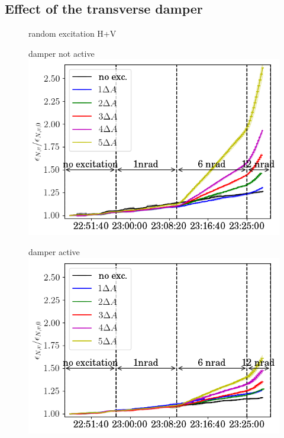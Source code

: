 \documentclass[%
 reprint,
 amsmath,amssymb,
 aps,
prstab,
]{revtex4-1}
\begin{document}
\subsection{Effect of the transverse damper\label{sec:damp}}
\begin{figure}[b]
	\centering
	random excitation H+V\\
	\begin{minipage}[t]{0.49\linewidth}
		\centering
		damper not active
		\includegraphics[width=1.0\linewidth]{2017_emitv_avg_rel_vran_no_damper.png}
	\end{minipage}	
	\begin{minipage}[t]{0.49\linewidth}
		\centering
		damper active
		\includegraphics[width=1.0\linewidth]{2017_emitv_avg_rel_vran_with_damper.png}
	\end{minipage}	
	\centering

\end{figure}
\end{document}
